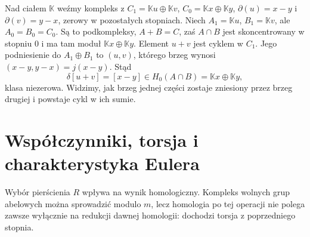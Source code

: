 \begin{przyklad}
\label{prz:mv-niezerowa-delta}
Nad ciałem $\mathbb K$ weźmy kompleks
z $C_1=\mathbb K u\oplus\mathbb K v$,
$C_0=\mathbb K x\oplus\mathbb K y$,
$\partial(u)=x-y$ i $\partial(v)=y-x$,
zerowy w pozostałych stopniach.
Niech $A_1=\mathbb K u$, $B_1=\mathbb K v$,
ale $A_0=B_0=C_0$. Są to podkompleksy,
$A+B=C$, zaś $A\cap B$ jest
skoncentrowany w stopniu $0$
i ma tam moduł $\mathbb K x\oplus\mathbb K y$.
Element $u+v$ jest cyklem w $C_1$.
Jego podniesienie do $A_1\oplus B_1$ to $(u,v)$,
którego brzeg wynosi
$(x-y,y-x)=j(x-y)$. Stąd
\[
 \delta[u+v]=[x-y]
 \in H_0(A\cap B)=\mathbb K x\oplus\mathbb K y,
\]
klasa niezerowa. Widzimy, jak brzeg
jednej części zostaje zniesiony
przez brzeg drugiej i powstaje
cykl w ich sumie.
\end{przyklad}

\section{Współczynniki, torsja i charakterystyka Eulera}
\label{sec:wspolczynniki-euler}

Wybór pierścienia $R$ wpływa na
wynik homologiczny. Kompleks
wolnych grup abelowych
można sprowadzić modulo $m$,
lecz homologia po tej operacji
nie polega zawsze wyłącznie
na redukcji dawnej homologii:
dochodzi torsja z poprzedniego stopnia.

